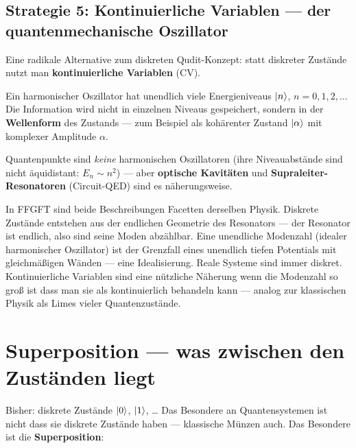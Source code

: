 \subsection{Strategie 5: Kontinuierliche Variablen ---
  der quantenmechanische Oszillator}
\label{sec:cv}

Eine radikale Alternative zum diskreten Qudit-Konzept:
statt diskreter Zustände nutzt man
\textbf{kontinuierliche Variablen} (CV).

Ein harmonischer Oszillator hat unendlich viele
Energieniveaus $\left|n\right\rangle$, $n = 0, 1, 2, \ldots$
Die Information wird nicht in einzelnen Niveaus
gespeichert, sondern in der \textbf{Wellenform}
des Zustands --- zum Beispiel als kohärenter Zustand
$\left|\alpha\right\rangle$ mit komplexer Amplitude $\alpha$.

Quantenpunkte sind \emph{keine} harmonischen Oszillatoren
(ihre Niveauabstände sind nicht äquidistant: $E_n \sim n^2$) ---
aber \textbf{optische Kavitäten} und
\textbf{Supraleiter-Resonatoren} (Circuit-QED) sind es näherungsweise.

\begin{keypoint}
In FFGFT sind beide Beschreibungen Facetten derselben
Physik. Diskrete Zustände entstehen aus der
endlichen Geometrie des Resonators --- der Resonator
ist endlich, also sind seine Moden abzählbar.
Eine unendliche Modenzahl (idealer harmonischer Oszillator)
ist der Grenzfall eines unendlich tiefen Potentials
mit gleichmäßigen Wänden --- eine Idealisierung.
Reale Systeme sind immer diskret.
Kontinuierliche Variablen sind eine nützliche Näherung
wenn die Modenzahl so groß ist dass man sie
als kontinuierlich behandeln kann ---
analog zur klassischen Physik als Limes vieler Quantenzustände.
\end{keypoint}

\section{Superposition --- was zwischen den Zuständen liegt}
\label{sec:superposition}

Bisher: diskrete Zustände $\left|0\right\rangle$, $\left|1\right\rangle$, \ldots
Das Besondere an Quantensystemen ist nicht dass sie
diskrete Zustände haben --- klassische Münzen auch.
Das Besondere ist die \textbf{Superposition}:

